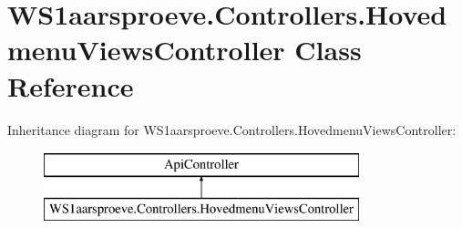 \hypertarget{class_w_s1aarsproeve_1_1_controllers_1_1_hovedmenu_views_controller}{}\section{W\+S1aarsproeve.\+Controllers.\+Hovedmenu\+Views\+Controller Class Reference}
\label{class_w_s1aarsproeve_1_1_controllers_1_1_hovedmenu_views_controller}
Inheritance diagram for W\+S1aarsproeve.\+Controllers.\+Hovedmenu\+Views\+Controller\+:\begin{figure}[H]
\begin{center}
\leavevmode
\includegraphics[height=2.000000cm]{class_w_s1aarsproeve_1_1_controllers_1_1_hovedmenu_views_controller}
\end{center}
\end{figure}
